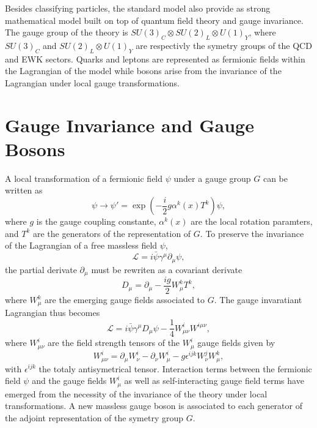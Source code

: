   Besides classifying particles, the standard model also provide as strong mathematical model built on top of quantum field theory and gauge invariance. The gauge group of the theory is $ SU(3)_C \otimes SU(2)_L \otimes U(1)_Y $, where $ SU(3)_C $ and $ SU(2)_L \otimes U(1)_Y $ are respectivly the symetry groups of the QCD and EWK sectors. Quarks and leptons are represented as fermionic fields within the Lagrangian of the model while bosons arise from the invariance of the Lagrangian under local gauge transformations. \\

  \section{Gauge Invariance and Gauge Bosons}

    A local transformation of a fermionic field $ \psi $ under a gauge group $ G $  can be written as
    \begin{equation}
      \psi \rightarrow \psi' = \exp\left(- \frac{i}{2} g \alpha^k(x) T^k \right) \psi ,
    \end{equation}
    where $ g $ is the gauge coupling constante, $ \alpha^k(x) $ are the local rotation paramters, and $ T^k $ are the generators of the representation of $ G $. To preserve the invariance of the Lagrangian of a free massless field $ \psi $,
    \begin{equation}
      \mathcal{L} = i \bar{\psi} \gamma^\mu \partial_\mu \psi ,
    \end{equation}
    the partial derivate $ \partial_\mu $ must be rewriten as a covariant derivate
    \begin{equation}
      D_\mu = \partial_\mu - \frac{i g}{2} W^k_\mu T^k ,
    \end{equation}
    where $ W^k_\mu $ are the emerging gauge fields associated to $ G $. The gauge invaratiant Lagrangian thus becomes
    \begin{equation}
      \mathcal{L} = i \bar{\psi} \gamma^\mu D_\mu \psi - \frac{1}{4} W^i_{\mu \nu} W^{i \mu \nu} ,
    \end{equation}
    where $ W^i_{\mu \nu} $ are the field strength tensors of the $ W^i_\mu $ gauge fields given by
    \begin{equation}
      W^i_{\mu \nu} = \partial_\mu W^i_\nu - \partial_\nu W^i_\mu - g \epsilon^{ijk} W^j_\nu W^k_\mu ,
    \end{equation}
    with $ \epsilon^{ijk} $ the totaly antisymetrical tensor. Interaction terms between the fermionic field $ \psi $ and the gauge fields $ W^i_\mu $ as well as self-interacting gauge field terms have emerged from the necessity of the invariance of the theory under local transformations. A new massless gauge boson is associated to each generator of the adjoint representation of the symetry group $ G $.

